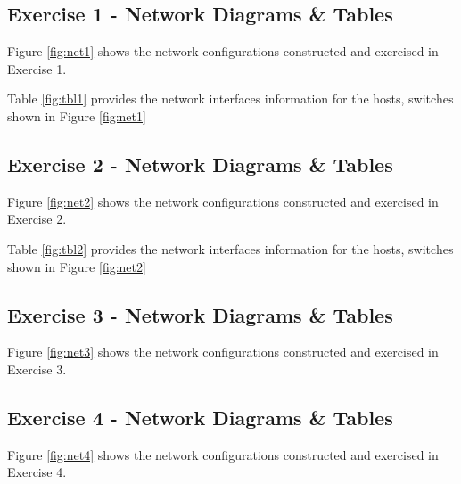 \documentclass[main.tex]{subfiles}
\begin{document}
\subsection{Exercise 1 - Network  Diagrams \& Tables}
\noindent Figure \ref{fig:net1} shows the network configurations constructed and exercised in Exercise 1.\\

\break

\noindent Table \ref{fig:tbl1} provides the network interfaces information for the hosts, switches shown in Figure \ref{fig:net1}


\subsection{Exercise 2 - Network  Diagrams \& Tables}


\noindent Figure \ref{fig:net2} shows the network configurations constructed and exercised in Exercise 2.\\

\break

\noindent Table \ref{fig:tbl2} provides the network interfaces information for the hosts, switches shown in Figure \ref{fig:net2}

\subsection{Exercise 3 - Network  Diagrams \& Tables}

\noindent Figure \ref{fig:net3} shows the network configurations constructed and exercised in Exercise 3.\\

\subsection{Exercise 4 - Network  Diagrams \& Tables}
\noindent Figure \ref{fig:net4} shows the network configurations constructed and exercised in Exercise 4.\\
\end{document}
